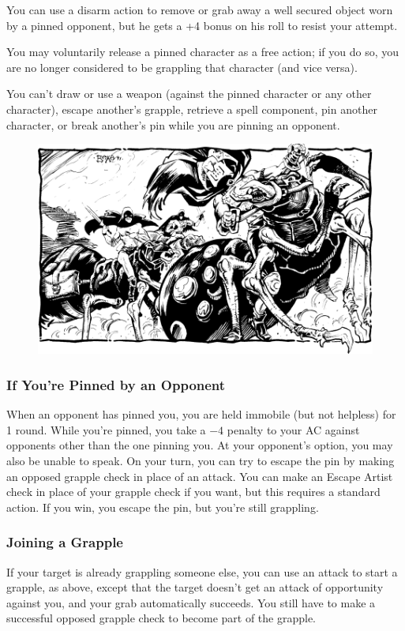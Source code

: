 You can use a disarm action to remove or grab away a well secured object worn by a pinned opponent, but he gets a +4 bonus on his roll to resist your attempt.

You may voluntarily release a pinned character as a free action; if you do so, you are no longer considered to be grappling that character (and vice versa).

You can't draw or use a weapon (against the pinned character or any other character), escape another's grapple, retrieve a spell component, pin another character, or break another's pin while you are pinning an opponent.

\begin{figure}[t!]
\centering
\includegraphics[width=\textwidth]{images/raiders-1.png}
\WOTC
\end{figure}

\subsubsection{If You're Pinned by an Opponent}
When an opponent has pinned you, you are held immobile (but not helpless) for 1 round. While you're pinned, you take a $-4$ penalty to your AC against opponents other than the one pinning you. At your opponent's option, you may also be unable to speak. On your turn, you can try to escape the pin by making an opposed grapple check in place of an attack. You can make an Escape Artist check in place of your grapple check if you want, but this requires a standard action. If you win, you escape the pin, but you're still grappling.

\subsubsection{Joining a Grapple}
If your target is already grappling someone else, you can use an attack to start a grapple, as above, except that the target doesn't get an attack of opportunity against you, and your grab automatically succeeds. You still have to make a successful opposed grapple check to become part of the grapple.

